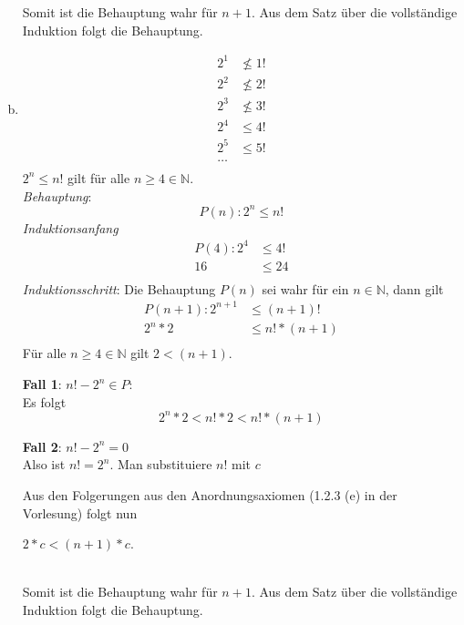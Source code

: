 \documentclass{article}
\begin{document}
\begin{enumerate}[a)]
  Somit ist die Behauptung wahr für $n + 1$.
  Aus dem Satz über die vollständige Induktion folgt die Behauptung.
  
\item
  \begin{align*}
    2^1 &\nleq 1! \\
    2^2 &\nleq 2! \\
    2^3 &\nleq 3! \\
    2^4 &\leq 4! \\
    2^5 &\leq 5! \\
    \ldots \\
  \end{align*}
  $2^n \leq n!$ gilt für alle $n \geq 4 \in \mathbb{N}$. \\
  \emph{Behauptung}:
  \[
    P(n) \colon 2^n \leq n! 
  \]
  \emph{Induktionsanfang}
  \begin{align*}
    P(4) \colon 2^4 &\leq 4! \\
                 16 &\leq 24 \\
  \end{align*}
  \emph{Induktionsschritt}: Die Behauptung $P(n)$ sei wahr für ein $n \in \mathbb{N}$,
  dann gilt \\
  
  \begin{align*}
    P(n + 1) \colon 2^{n + 1} &\leq (n + 1)! \\
                      2^n * 2 &\leq n! * (n + 1) \\
  \end{align*}
  Für alle $n \geq 4 \in \mathbb{N}$ gilt $2 < (n + 1)$. \\
  
  \begin{minipage}[t]{.45\textwidth}
    \textbf{Fall 1}: $n! - 2^n \in P$: \\
    
    Es folgt
    \[
      2^n * 2 < n! * 2 < n! * (n + 1)
    \]
  \end{minipage}
  \hfill
  \vrule
  \hfill
  \begin{minipage}[t]{.45\textwidth}
    \textbf{Fall 2}: $n! - 2^n = 0$ \\

    Also ist $n! = 2^n$. Man substituiere $n!$ mit $c$
    
    Aus den Folgerungen aus den Anordnungsaxiomen (1.2.3 (e) in der Vorlesung) folgt nun
    
    $2 * c < (n + 1) * c$.
  \end{minipage} \\
  Somit ist die Behauptung wahr für $n + 1$.
  Aus dem Satz über die vollständige Induktion folgt die Behauptung.


\end{enumerate}
\end{document}

